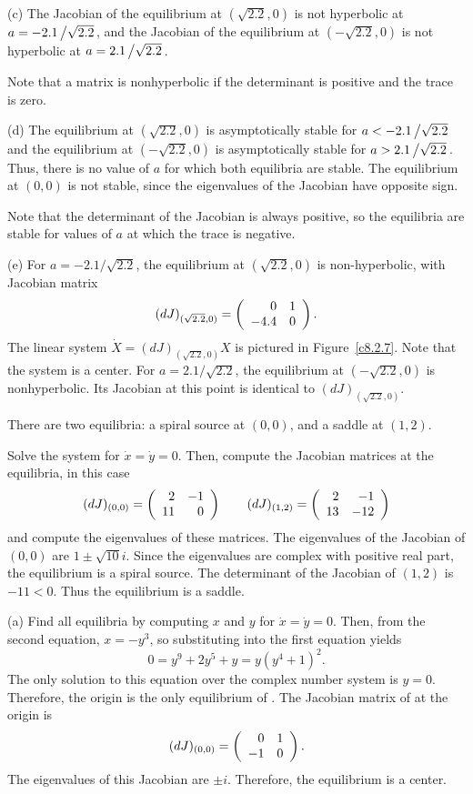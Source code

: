 \documentclass{ximera}
\begin{document}
(c) \ans The Jacobian of the equilibrium at $(\sqrt{2.2},0)$ is not
hyperbolic at $a = -2.1\left/\sqrt{2.2}\right.$, and the Jacobian of the
equilibrium at $(-\sqrt{2.2},0)$ is not hyperbolic at
$a = 2.1\left/\sqrt{2.2}\right.$.

\soln Note that a matrix is nonhyperbolic if the determinant is positive
and the trace is zero.

(d) \ans The equilibrium at $(\sqrt{2.2},0)$ is asymptotically stable for
$a < -2.1\left/\sqrt{2.2}\right.$ and the equilibrium at
$(-\sqrt{2.2},0)$ is asymptotically stable for
$a > 2.1\left/\sqrt{2.2}\right.$.  Thus, there is no value of $a$ for which
both equilibria are stable.  The equilibrium at $(0,0)$ is not stable,
since the eigenvalues of the Jacobian have opposite sign.

\soln Note that the determinant of the Jacobian is always positive, so
the equilibria are stable for values of $a$ at which the trace is negative.

(e) For $a = -2.1/\sqrt{2.2}$, the equilibrium at $(\sqrt{2.2},0)$
is non-hyperbolic, with Jacobian matrix
\[
(dJ)_{(\sqrt{2.2},0)} = \left(\begin{array}{rr} 0 & 1\\ -4.4 &0\end{array}\right).
\]
The linear system $\dot{X} = (dJ)_{(\sqrt{2.2},0)}X$ is pictured in
Figure~\ref{c8.2.7}.  Note that the system is a center.  For
$a = 2.1/\sqrt{2.2}$, the equilibrium at $(-\sqrt{2.2},0)$ is
nonhyperbolic.  Its Jacobian at this point is identical to
$(dJ)_{(\sqrt{2.2},0)}$.

\begin{figure}[htb]
                       \centerline{%
                       }
\end{figure}

\ans There are two equilibria: a spiral source at $(0,0)$, and a saddle
at $(1,2)$.

\soln Solve the system for $\dot{x} = \dot{y} = 0$.  Then, compute the
Jacobian matrices at the equilibria, in this case
\[
(dJ)_{(0,0)} = \left(\begin{array}{rr} 2 & -1\\ 11 &0\end{array}\right) \qquad
(dJ)_{(1,2)} = \left(\begin{array}{rr} 2 & -1\\ 13 &-12\end{array}\right)
\]
and compute the eigenvalues of these matrices.  The eigenvalues of the
Jacobian of $(0,0)$ are $1 \pm \sqrt{10}i$.  Since the eigenvalues
are complex with positive real part, the equilibrium is
a spiral source.  The determinant of the Jacobian of $(1,2)$ is
$-11 < 0$.  Thus the equilibrium is a saddle.

(a) Find all equilibria by computing $x$ and $y$ for $\dot{x} =
\dot{y} = 0$.  Then, from the second equation, $x = -y^3$, so
substituting into the first equation yields
\[
0 = y^9 + 2y^5 + y = y(y^4 + 1)^2.
\]
The only solution to this equation over the complex number system is
$y = 0$.  Therefore, the origin is the only equilibrium of
.  The Jacobian matrix of  at
the origin is 
\[
(dJ)_{(0,0)} = \left(\begin{array}{rr} 0 & 1\\ -1 &0\end{array}\right).
\]
The eigenvalues of this Jacobian are $\pm i$.  Therefore, the equilibrium
is a center.
\end{document}
